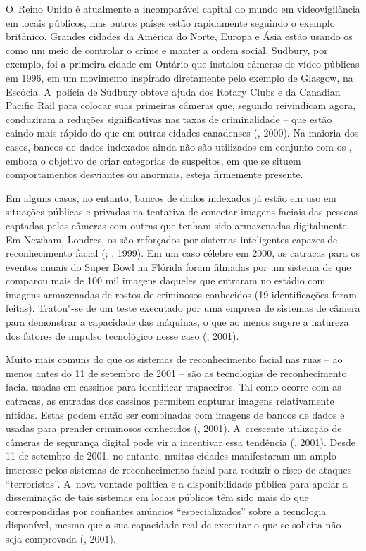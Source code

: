 O~Reino Unido é atualmente a incomparável capital do mundo em
videovigilância em locais públicos, mas outros países estão rapidamente
seguindo o exemplo britânico. Grandes cidades da América do Norte,
Europa e Ásia estão usando os  como um meio de controlar o crime e
manter a ordem social. Sudbury, por exemplo, foi a primeira cidade em
Ontário que instalou câmeras de vídeo públicas em 1996, em um movimento
inspirado diretamente pelo exemplo de Glasgow, na Escócia. A~polícia de
Sudbury obteve ajuda dos Rotary Clubs e da Canadian Pacific Rail para
colocar suas primeiras câmeras que, segundo reivindicam agora,
conduziram a reduções significativas nas taxas de criminalidade -- que
estão caindo mais rápido do que em outras cidades canadenses (,
2000). Na maioria dos casos, bancos de dados indexados ainda não são
utilizados em conjunto com os , embora o objetivo de criar
categorias de suspeitos, em que se situem comportamentos desviantes ou
anormais, esteja firmemente presente.

Em alguns casos, no entanto, bancos de dados indexados já estão em uso
em situações públicas e privadas na tentativa de conectar imagens
faciais das pessoas captadas pelas câmeras com outras que tenham sido
armazenadas digitalmente. Em Newham, Londres, os  são reforçados por
sistemas inteligentes capazes de reconhecimento facial (;
, 1999). Em um caso célebre em 2000, as catracas para os
eventos anuais do Super Bowl na Flórida foram filmadas por um sistema de
 que comparou mais de 100 mil imagens daqueles que entraram no
estádio com imagens armazenadas de rostos de criminosos conhecidos (19
identificações foram feitas). Tratou"-se de um teste executado por uma
empresa de sistemas de câmera para demonstrar a capacidade das máquinas,
o que ao menos sugere a natureza dos fatores de impulso tecnológico
nesse caso (, 2001).

Muito mais comuns do que os sistemas de reconhecimento facial nas ruas
-- ao menos antes do 11 de setembro de 2001 -- são as tecnologias de
reconhecimento facial usadas em cassinos para identificar trapaceiros.
Tal como ocorre com as catracas, as entradas dos cassinos permitem
capturar imagens relativamente nítidas. Estas podem então ser combinadas
com imagens de bancos de dados e usadas para prender criminosos
conhecidos (, 2001). A~crescente utilização de câmeras de segurança
digital pode vir a incentivar essa tendência (, 2001). Desde 11 de
setembro de 2001, no entanto, muitas cidades manifestaram um amplo
interesse pelos sistemas  de reconhecimento facial para reduzir o
risco de ataques ``terroristas''. A~nova vontade política e a
disponibilidade pública para apoiar a disseminação de tais sistemas em
locais públicos têm sido mais do que correspondidas por confiantes
anúncios ``especializados'' sobre a tecnologia disponível, mesmo que a
sua capacidade real de executar o que se solicita não seja comprovada
(, 2001).

